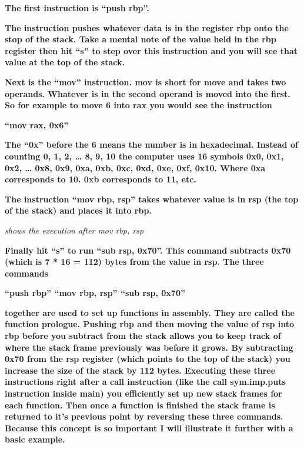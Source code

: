 \textbf{The first instruction is ``push rbp''.}

  
 

\textbf{The instruction pushes whatever data is in the register rbp onto the stop of the stack. Take a mental note of
the value held in the rbp register then hit ``s'' to step over this instruction and you will see that value at the top
of the stack.}

  
 

\textbf{Next is the ``mov'' instruction. mov is short for move and takes two operands. Whatever is in the second operand
is moved into the first. So for example to move 6 into rax you would see the instruction}

\textbf{{}``mov rax, 0x6''}

\textbf{The ``0x'' before the 6 means the number is in hexadecimal. Instead of counting 0, 1, 2, {\dots} 8, 9, 10 the
computer uses 16 symbols 0x0, 0x1, 0x2, {\dots} 0x8, 0x9, 0xa, 0xb, 0xc, 0xd, 0xe, 0xf, 0x10. Where 0xa corresponds to
10. 0xb corresponds to 11, etc.}

\textbf{The instruction ``mov rbp, rsp'' takes whatever value is in rsp (the top of the stack) and places it into rbp.}

  
 

\textit{shows the execution after mov rbp, rsp}

\textbf{Finally hit ``s'' to run ``sub rsp, 0x70''. This command subtracts 0x70 (which is 7 * 16 = 112) bytes from the
value in rsp. The three commands}

\textbf{{}``push rbp''\newline
{}``mov rbp, rsp''\newline
{}``sub rsp, 0x70''}

\textbf{together are used to set up functions in assembly. They are called the function prologue. Pushing rbp and then
moving the value of rsp into rbp before you subtract from the stack allows you to keep track of where the stack frame
previously was before it grows. By subtracting 0x70 from the rsp register (which points to the top of the stack) you
increase the size of the stack by 112 bytes. Executing these three instructions right after a call instruction (like
the call sym.imp.puts instruction inside main) you efficiently set up new stack frames for each function. Then once a
function is finished the stack frame is returned to it's previous point by reversing these three commands. Because this
concept is so important I will illustrate it further with a basic example.}

